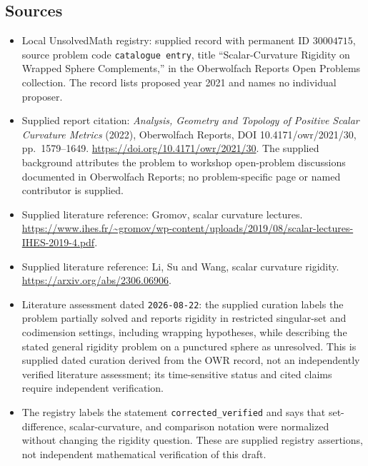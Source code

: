 \documentclass[11pt]{article}
\begin{document}
\subsection{Sources}
\begin{itemize}
\item Local UnsolvedMath registry: supplied record with permanent ID \(30004715\), source problem code \texttt{catalogue entry}, title ``Scalar-Curvature Rigidity on Wrapped Sphere Complements,'' in the Oberwolfach Reports Open Problems collection. The record lists proposed year 2021 and names no individual proposer.
\item Supplied report citation: \emph{Analysis, Geometry and Topology of Positive Scalar Curvature Metrics} (2022), Oberwolfach Reports, DOI 10.4171/owr/2021/30, pp.\ 1579--1649. \url{https://doi.org/10.4171/owr/2021/30}. The supplied background attributes the problem to workshop open-problem discussions documented in Oberwolfach Reports; no problem-specific page or named contributor is supplied.
\item Supplied literature reference: Gromov, scalar curvature lectures. \url{https://www.ihes.fr/~gromov/wp-content/uploads/2019/08/scalar-lectures-IHES-2019-4.pdf}.
\item Supplied literature reference: Li, Su and Wang, scalar curvature rigidity. \url{https://arxiv.org/abs/2306.06906}.
\item Literature assessment dated \texttt{2026-08-22}: the supplied curation labels the problem partially solved and reports rigidity in restricted singular-set and codimension settings, including wrapping hypotheses, while describing the stated general rigidity problem on a punctured sphere as unresolved. This is supplied dated curation derived from the OWR record, not an independently verified literature assessment; its time-sensitive status and cited claims require independent verification.
\item The registry labels the statement \texttt{corrected\_verified} and says that set-difference, scalar-curvature, and comparison notation were normalized without changing the rigidity question. These are supplied registry assertions, not independent mathematical verification of this draft.
\end{itemize}
\end{document}
